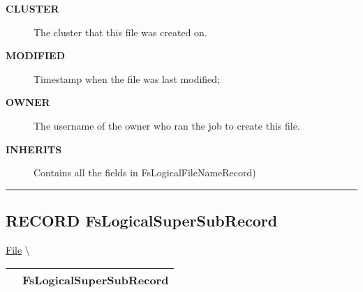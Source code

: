 \par
\begin{description}
\item [\colorbox{tagtype}{\color{white} \textbf{\textsf{CLUSTER}}}] The cluster that this file was created on.
\end{description}






\par
\begin{description}
\item [\colorbox{tagtype}{\color{white} \textbf{\textsf{MODIFIED}}}] Timestamp when the file was last modified;
\end{description}






\par
\begin{description}
\item [\colorbox{tagtype}{\color{white} \textbf{\textsf{OWNER}}}] The username of the owner who ran the job to create this file.
\end{description}







\par
\begin{description}
\item [\colorbox{tagtype}{\color{white} \textbf{\textsf{INHERITS}}}] Contains all the fields in FsLogicalFileNameRecord)
\end{description}



\rule{\linewidth}{0.5pt}
\subsection*{\textsf{\colorbox{headtoc}{\color{white} RECORD}
FsLogicalSuperSubRecord}}

\hypertarget{ecldoc:file.fslogicalsupersubrecord}{}
\hspace{0pt} \hyperlink{ecldoc:File}{File} \textbackslash 

{\renewcommand{\arraystretch}{1.5}
\begin{tabularx}{\textwidth}{|>{\raggedright\arraybackslash}l|X|}
\hline
\hspace{0pt}\mytexttt{\color{red} } & \textbf{FsLogicalSuperSubRecord} \\
\hline
\end{tabularx}
}

